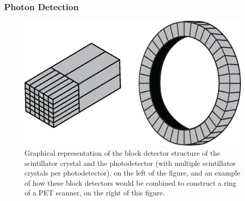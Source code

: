             \subsubsection{Photon Detection} \label{sec:photon_detection}
                \begin{figure}
                    \centering
                    
                    \includegraphics[width=1.0\linewidth]{figures/background_detector.png}
                    
                    \captionsetup{singlelinecheck=false, justification=raggedright}
                    \caption{Graphical representation of the block detector structure of the scintillator crystal and the photodetector (with multiple scintillator crystals per photodetector), on the left of the figure, and an example of how these block detectors would be combined to construct a ring of a \gls{PET} scanner, on the right of this figure.} \label{fig:photon_detection_detector}
                \end{figure}
                
